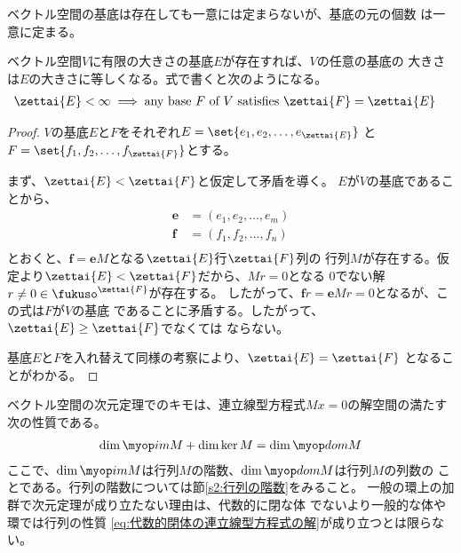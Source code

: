 	ベクトル空間の基底は存在しても一意には定まらないが、基底の元の個数
	は一意に定まる。

	\begin{proposition}[ベクトル空間の次元定理]\label{prop:ベクトル空間の次元定理} %
		ベクトル空間$V$に有限の大きさの基底$E$が存在すれば、$V$の任意の基底の
		大きさは$E$の大きさに等しくなる。式で書くと次のようになる。
		\begin{equation*}\begin{split} %
			\zettai{E}<\infty &\implies 
			\text{any base $F$ of $V$ satisfies }\zettai{F}=\zettai{E}
		\end{split}\end{equation*} %
	\end{proposition} %
	\begin{proof} %
		$V$の基底$E$と$F$をそれぞれ$E=\set{e_1,e_2,\dots,e_{\zettai{E}}}$
		と$F=\set{f_1,f_2,\dots,f_{\zettai{F}}}$とする。

		まず、$\zettai{E}<\zettai{F}$と仮定して矛盾を導く。
		$E$が$V$の基底であることから、
		\begin{equation*}\begin{split} %
			\mathbf{e} &= (e_1,e_2,\dots,e_m) \\
			\mathbf{f} &= (f_1,f_2,\dots,f_n) \\
		\end{split}\end{equation*} %
		とおくと、$\mathbf{f}=\mathbf{e}M$となる$\zettai{E}$行$\zettai{F}$列の
		行列$M$が存在する。仮定より$\zettai{E}<\zettai{F}$だから、$Mr=0$となる
		$0$でない解$r\neq0\in\fukuso^{\zettai{F}}$が存在する。
		したがって、$\mathbf{f}r=\mathbf{e}Mr=0$となるが、この式は$F$が$V$の基底
		であることに矛盾する。したがって、$\zettai{E}\ge\zettai{F}$でなくては
		ならない。

		基底$E$と$F$を入れ替えて同様の考察により、$\zettai{E}=\zettai{F}$
		となることがわかる。
	\end{proof} %

	\begin{note}[次元定理の加群との対比]\label{note:次元定理の加群との対比} %
		ベクトル空間の次元定理でのキモは、連立線型方程式$Mx=0$の解空間の満たす
		次の性質である。
		\begin{equation}\label{eq:代数的閉体の連立線型方程式の解}\begin{split} %
			\dim\im M + \dim\ker M = \dim\dom M \\
		\end{split}\end{equation} %
		ここで、$\dim\im M$は行列$M$の階数、$\dim\dom M$は行列$M$の列数の
		ことである。行列の階数については節\ref{s2:行列の階数}をみること。
		一般の環上の加群で次元定理が成り立たない理由は、代数的に閉な体
		でないより一般的な体や環では行列の性質
		\eqref{eq:代数的閉体の連立線型方程式の解}が成り立つとは限らない。
	\end{note} %

